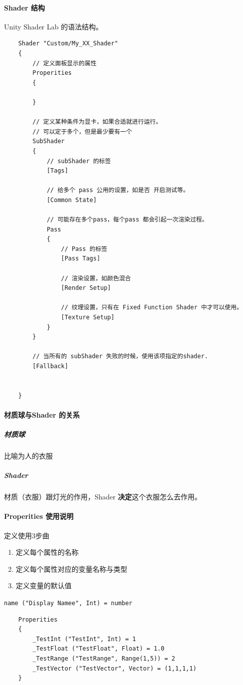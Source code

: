 \documentclass[UTF8,a4paper,12pt]{ctexbook}
\begin{document}
		\paragraph{Shader 结构}
			Unity Shader Lab 的语法结构。
			\begin{lstlisting}
	Shader "Custom/My_XX_Shader"
	{
		// 定义面板显示的属性
		Properities
		{
			
		}
		
		// 定义某种条件为显卡，如果合适就进行运行。
		// 可以定于多个，但是最少要有一个
		SubShader
		{
			// subShader 的标签
			[Tags]
			
			// 给多个 pass 公用的设置，如是否 开启测试等。
			[Common State]
			
			// 可能存在多个pass，每个pass 都会引起一次渲染过程。
			Pass
			{
				// Pass 的标签
				[Pass Tags]
				
				// 渲染设置，如颜色混合
				[Render Setup]
				
				// 纹理设置，只有在 Fixed Function Shader 中才可以使用。
				[Texture Setup]
			}
		}
		
		// 当所有的 subShader 失败的时候，使用该项指定的shader.
		[Fallback]
		
		
	}
			\end{lstlisting}
			
		
		\paragraph{材质球与Shader 的关系}
			\subparagraph{材质球}
				比喻为人的衣服
			
			\subparagraph{Shader}
				材质（衣服）跟灯光的作用，Shader \textbf{决定}这个衣服怎么去作用。
								
		
		\paragraph{Properities 使用说明}
			定义使用3步曲
			\begin{enumerate}
				\item 定义每个属性的名称
				\item 定义每个属性对应的变量名称与类型
				\item 定义变量的默认值
			\end{enumerate}
		
			\verb|name ("Display Namee", Int) = number|
			\begin{lstlisting}
	Properities
	{
		_TestInt ("TestInt", Int) = 1
		_TestFloat ("TestFloat", Float) = 1.0
		_TestRange ("TestRange", Range(1,5)) = 2
		_TestVector ("TestVector", Vector) = (1,1,1,1)
	}
			\end{lstlisting}
			
\end{document}
